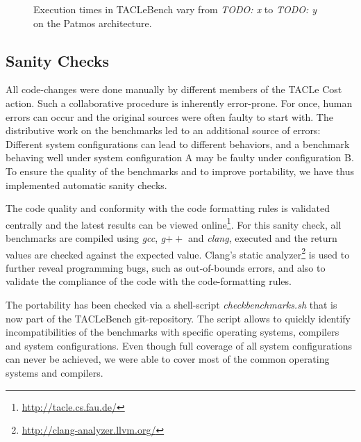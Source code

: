 \documentclass[a4paper,UKenglish]{oasics}
\newcommand{\todo}[1]{{\emph{TODO: #1}}}
\begin{document}
\begin{figure}[t]
  \def\resultfile{eval/wcet.csv}
  
  \caption{Execution times in TACLeBench vary from \todo{x} to \todo{y} on the Patmos architecture.}
  \label{fig:execution-times}
\end{figure}

\subsection{Sanity Checks}
All code-changes were done manually by different members of the TACLe Cost action.
Such a collaborative procedure is inherently error-prone.
For once, human errors can occur and the original sources were often faulty to start with.
The distributive work on the benchmarks led to an additional source of errors:
Different system configurations can lead to different behaviors, and a benchmark behaving well under system configuration A may be faulty under configuration B.
To ensure the quality of the benchmarks and to improve portability, we have thus implemented automatic sanity checks.

The code quality and conformity with the code formatting rules is validated centrally and the latest results can be viewed online\footnote{\url{http://tacle.cs.fau.de/}}.
For this sanity check, all benchmarks are compiled using \textit{gcc}, \textit{g$++$} and \textit{clang}, executed and the return values are checked against the expected value.
Clang's static analyzer\footnote{\url{http://clang-analyzer.llvm.org/}} is used to further reveal programming bugs, such as out-of-bounds errors, and also to validate the compliance of the code with the code-formatting rules.

The portability has been checked via a shell-script \textit{checkbenchmarks.sh} that is now part of the TACLeBench git-repository.
The script allows to quickly identify incompatibilities of the benchmarks with specific operating systems, compilers and system configurations.
Even though full coverage of all system configurations can never be achieved, we were able to cover most of the common operating systems and compilers.

\end{document}
